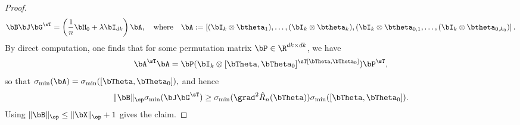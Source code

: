 \begin{proof}
\begin{equation}
    \bB \bJ\bG^\sT = 
       \left(\frac1n \bH_0 + \lambda\bI_{dk}\right)\bA,
       \quad\textrm{where}
       \quad
       \bA := \left[(\bI_k \otimes \btheta_1),\dots,(\bI_k\otimes\btheta_k),(\bI_k \otimes \btheta_{0,1},\dots,(\bI_k\otimes\btheta_{0,k_0})\right].
\end{equation}
By direct computation, one finds that for some permutation matrix $\bP \in \R^{dk \times dk}$, we have
\begin{equation}
    \bA^\sT\bA = \bP (\bI_k \otimes [\bTheta,\bTheta_0]^\sT[\bTheta,\bTheta_0]) \bP^\sT,
\end{equation}
so that $\sigma_{\min}(\bA) =  \sigma_{\min}([\bTheta,\bTheta_0]),$  and hence
\begin{equation}
    \|\bB\|_\op \sigma_{\min}(\bJ \bG^\sT) \ge 
    \sigma_{\min}(\grad^2 \hat R_n(\bTheta)) \sigma_{\min}([\bTheta,\bTheta_0]).
\end{equation}
Using $\|\bB\|_\op \le \|\bX\|_\op + 1$ gives the claim.
\end{proof}

